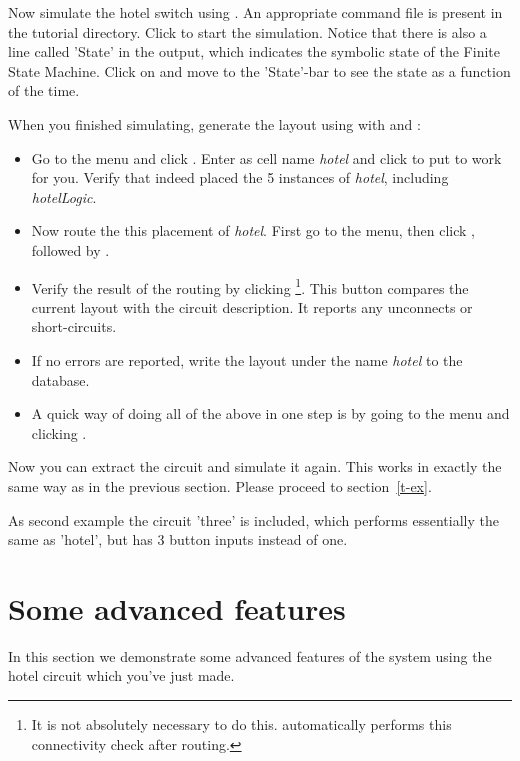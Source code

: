 Now simulate the hotel switch using . An appropriate command
file is present in the tutorial directory. Click  to start the
simulation. Notice that there is also a line called 'State' in the output,
which indicates the symbolic state of the Finite State Machine. 
Click on  and move to the 'State'-bar to see the state as a
function of the time.

When you finished simulating, generate the layout using 
with  and : 
\begin{itemize}
\item
Go to the  menu and click . Enter
as cell name {\sl hotel} and click  to put 
to work for you. Verify that  indeed placed the 5 instances of
{\sl hotel}, including {\sl hotelLogic}. 
\item
Now route the this placement of {\sl hotel}. First go to the 
menu, then click
, followed by . 
\item
Verify the result of the routing by clicking 
\footnote{It is not absolutely necessary to do this.
 automatically performs this connectivity check after routing.}. 
This button compares the current layout with the circuit description. It
reports any unconnects or short-circuits. 
\item
If no errors are reported, write the layout under the
name {\sl hotel} to the database.
\item
A quick way of doing all of the above in one step is by going to the
 menu and clicking .
\end{itemize}

Now you can extract the circuit and simulate it again. This
works in exactly the same way as in the previous section. Please proceed to
section~\ref{t-ex}.

As second example the circuit 'three' is included, which performs essentially
the same as 'hotel', but has 3 button inputs instead of one. 

\section{Some advanced features}
\label{s-advanced}
In this section we demonstrate some advanced features of the 
system using the hotel circuit which you've just made. 

